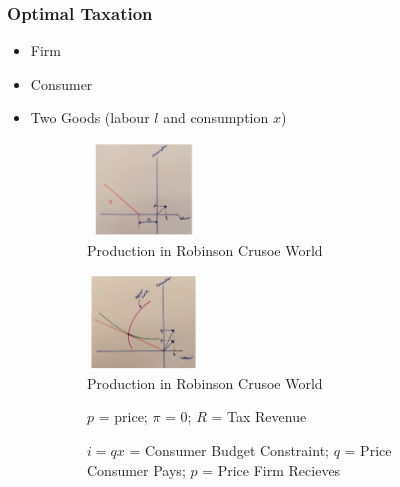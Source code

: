\documentclass[11pt, english]{article}
\begin{document}
		\subsubsection{Optimal Taxation}

	\begin{itemize}
	\setlength\itemsep{0cm}
		\item Firm
		\item Consumer
		\item Two Goods (labour $l$ and consumption $x$)
	\end{itemize}

	\begin{figure}[H]
        \begin{center}
                \begin{subfigure}[t]{7cm}
                \begin{center}
                        \includegraphics[width=3cm,height=2.5cm]{EC315-IMG/43.png}
                \end{center}
			\caption{Production in Robinson Crusoe World}
                \end{subfigure}
                \begin{subfigure}[t]{7cm}
                \begin{center}
                        \includegraphics[width=3cm,height=2.5cm]{EC315-IMG/44.png}
                \end{center}
			\caption{Production in Robinson Crusoe World}
                \end{subfigure}
        \quad
                \begin{subfigure}[t]{3.5cm}
                \begin{center}
			$p$ = price; $\pi$ = 0; $R$ = Tax Revenue
                \end{center}
                \end{subfigure}
                \begin{subfigure}[t]{3.5cm}
                \begin{center}
			$i=qx$ = Consumer Budget Constraint; $q$ = Price Consumer Pays; $p$ = Price Firm Recieves
                \end{center}
                \end{subfigure}
        \end{center}
        \end{figure}
\end{document}
